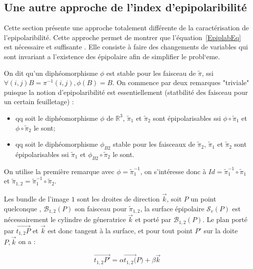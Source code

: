 \documentclass{ipol}
\newcommand{\RR}{\ensuremath{\mathbb{R}}}
\newcommand{\Bund}[1]{\ensuremath{\mathcal{B}_{#1}}}
\newcommand{\Sv}{\ensuremath{\mathcal{S}_{v}}}
\newcommand{\BigV}[1]{\ensuremath{\overrightarrow{#1}}}
\newcommand{\TanOT}[1]{\BigV{t_{1,2}#1}}
\newcommand{\PiVert}{\widetilde{\pi}}
\begin{document}

\subsection{Une autre approche de l'index d'epipolaribilit\'e}

Cette section pr\'esente une approche totalement diff\'erente de la caract\'erisation de l'epipolaribilit\'e.
Cette approche permet de montrer que l'\'equation~\ref{EpiplabEq}  est n\'ecessaire et suffisante .
Elle consiste \`a faire des changements de variables qui sont invariant a l'existence des \'epipolaire
afin de simplifier le probl`eme.

On dit qu'un   diph\'eomorphisme  $\phi$ est stable pour les faisceau de $\PiVert$,
ssi $\forall(i,j) B=\pi^{-1}(i,j) ,\phi (B) = B$.
On commence par deux remarques "triviale" puisque la notion d'epipolaribilit\'e est essentiellement 
(statbilit\'e des faisceau pour un certain feuilletage) :

\begin{itemize}
    \item  qq soit le diph\'eomorphisme $\phi$ de   $\RR^3$,  $\PiVert_1$  et $\PiVert_2$ 
	    sont \'epipolarisables ssi $\phi \circ \PiVert_1$  et $\phi \circ \PiVert_2$ le sont;

    \item  qq soit le diph\'eomorphisme  $\phi_{B2}$  stable  pour les faisceaux de $\PiVert_2$,
	    $\PiVert_1$  et $\PiVert_2$ sont \'epipolarisables ssi $\PiVert_1$  et $\phi_{B2} \circ \PiVert_2$
            le sont.
\end{itemize}

On utilise la premi\`ere remarque avec $\phi = \PiVert_1^{-1}$, on s'int\'eresse donc \`a
$Id =  \PiVert_1^{-1} \circ \PiVert_1$ et $\PiVert_{1,2} = \PiVert_1^{-1} \circ \PiVert_2$.

Les bundle de l'image $1$ sont les droites de direction $\BigV{k}$,
soit $P$ un point quelconque ,  $\Bund{1,2}(P)$ son faisceau pour  $\PiVert_{1,2}$,
la surface \'epipolaire $\Sv{(P)}$ est n\'ecessairement le cylindre de g\'eneratrice $\BigV{k}$ et
port\'e par  $\Bund{1,2}(P)$.  Le plan port\'e par  $\TanOT{P}$ et $\BigV{k}$ est donc tangent 
\`a la surface, et pour tout point $P'$ sur la doite  $P,\BigV{k}$ on a :


\begin{equation}
      \TanOT{P'} = \alpha \TanOT(P) + \beta \BigV{k}
\end{equation}
\end{document}

